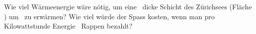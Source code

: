 Wie viel Wärmeenergie wäre nötig, um eine \dSO\ dicke Schicht des Zürichsees (Fläche \AZO) um \dTO\ zu erwärmen? Wie viel würde der Spass kosten, wenn man pro Kilowattstunde Energie \prkO\ Rappen bezahlt?

